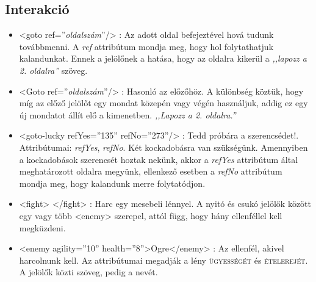 \documentclass[12pt,a4paper,oneside]{report}
\newcommand{\xtag}[1]{{\color{Tag}#1}}
\newcommand{\xattr}[2]{{\color{Attr}#1}={\color{Value}''#2''}}
\newcommand{\stat}{\textsc}
\newcommand{\attr}{\emph}
\begin{document}
            
    \subsection{Interakció}
      \begin{itemize}
        \item <\xtag{goto} \xattr{ref}{\emph{oldalszám}}/>          
          : Az adott oldal befejeztével hová tudunk továbbmenni. A
          \attr{ref} attribútum mondja meg, hogy hol folytathatjuk
          kalandunkat. Ennek a jelölőnek a hatása, hogy az oldalra
          kikerül a \emph{,,lapozz a 2. oldalra''} szöveg.
    
        \item <\xtag{Goto} \xattr{ref}{\emph{oldalszám}}/>          
          : Hasonló az előzőhöz. A különbség köztük, hogy míg az
          előző jelölőt egy mondat közepén vagy végén használjuk,
          addig ez egy új mondatot állít elő a
          kimenetben. \emph{,,Lapozz a 2. oldalra.''}
    
        \item <\xtag{goto-lucky} \xattr{refYes}{135} \xattr{refNo}{273}/>
          : Tedd próbára a
          szerencsédet!. Attribútumai: \attr{refYes}, \attr{refNo}. Két
          kockadobásra van szükségünk. Amennyiben a kockadobások
          szerencsét hoztak nekünk, akkor a \attr{refYes} attribútum
          által meghatározott oldalra megyünk, ellenkező esetben a
          \attr{refNo} attribútum mondja meg, hogy kalandunk merre
          folytatódjon.

        \item <\xtag{f{}ight}> <\xtag{/f{}ight}> : Harc egy
          mesebeli lénnyel. A nyitó és csukó jelölők között egy vagy
          több <\xtag{enemy}> szerepel, attól függ, hogy hány ellenféllel
          kell megküzdeni.
        \item <\xtag{enemy} \xattr{agility}{10} \xattr{health}{8}>Ogre<\xtag{/enemy}>
          : Az ellenfél, akivel harcolnunk kell. Az attribútumai
          megadják a lény \stat{ügyességét} és \stat{ételerejét}. A
          jelölők közti szöveg, pedig a nevét.
      \end{itemize}
      
\end{document}

